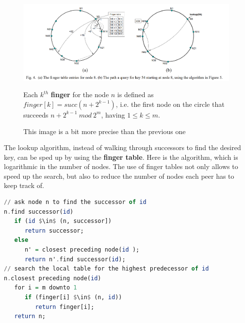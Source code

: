 \begin{figure}[htbp]
   \centering
   \includegraphics[width=0.95\columnwidth]{images/dht_chordfinger.png}
   \caption{This image is a bit more precise than the previous one}
   \label{fig:dht_chordfinger}
   Each $k^{th}$ \textbf{finger} for the node $n$ is defined as $finger[k] = succ(n+2^{k-1})$, i.e. the first node on the circle that succeeds $n+2^{k-1}\ mod\ 2^m$, having $1 \leq k \leq m$. 
\end{figure}

\begin{paracol}{2}
   \colfill
   The lookup algorithm, instead of walking through successors to find the desired key, can be sped up by using the \textbf{finger table}.
   Here is the algorithm, which is logarithmic in the number of nodes.
   The use of finger tables not only allows to speed up the search, but also to reduce the number of nodes each peer has to keep track of.

   \colfill
   \switchcolumn
   \begin{lstlisting}[mathescape=true,basicstyle={\footnotesize\ttfamily},language=Haskell]
// ask node n to find the successor of id
n.find successor(id)
   if (id $\in$ (n, successor])
      return successor;
   else
      n' = closest preceding node(id );
      return n'.find successor(id);
// search the local table for the highest predecessor of id
n.closest preceding node(id)
   for i = m downto 1
      if (finger[i] $\in$ (n, id))
         return finger[i];
   return n;  
   \end{lstlisting}
\end{paracol}

